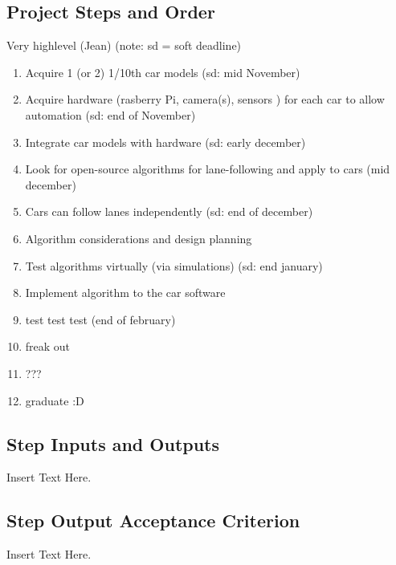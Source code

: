 \documentclass [12pt]{article}
\begin{document}
\subsection{Project Steps and Order}

Very highlevel (Jean)
(note:  sd = soft deadline)
\begin{enumerate}

\item Acquire 1 (or 2) 1/10th car models (sd: mid November)
\item Acquire hardware (rasberry Pi, camera(s), sensors ) for each car to allow automation (sd: end of November)
\item Integrate car models with hardware (sd: early december)
\item Look for open-source algorithms for lane-following and apply to cars (mid december)
\item Cars can follow lanes independently (sd: end of december)

\item Algorithm considerations and design planning
\item Test algorithms virtually (via simulations) (sd:  end january)
\item Implement algorithm to the car software 
\item test test test (end of february)

\item freak out 
\item ??? 

\item graduate :D



\end{enumerate}

\subsection{Step Inputs and Outputs}
Insert Text Here.

\subsection{Step Output Acceptance Criterion}
Insert Text Here.

\end{document}
